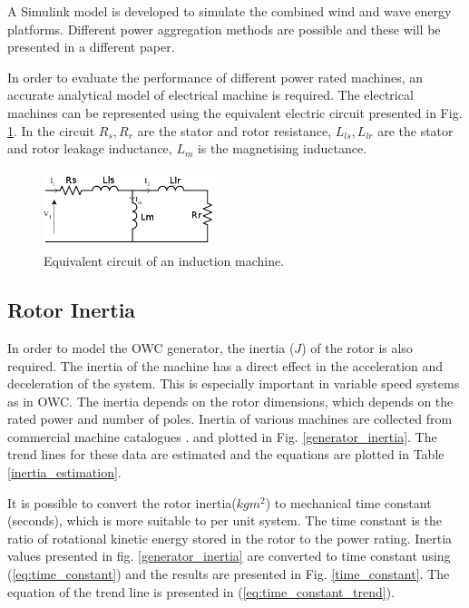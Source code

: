 \documentclass[twocolumn]{article}
\begin{document}
A Simulink model is developed to simulate the combined wind and wave energy platforms. Different power aggregation methods are possible and these will be presented in a different paper.

In order to evaluate the performance of different power rated machines, an accurate analytical model of electrical machine is required. The electrical machines can be represented using the equivalent electric circuit presented in Fig. \ref{equivalent_circuit}. In the circuit $R_s, R_r$ are the stator and rotor resistance, $L_{ls}, L_{lr}$ are the stator and rotor leakage inductance, $L_m$ is the magnetising inductance.


  \begin{figure}
    \centering
    \includegraphics[width=0.45\textwidth]{equivalent_circuit}
    \caption{Equivalent circuit of an induction machine.} 
    \label{equivalent_circuit}
  \end{figure}


\subsection{Rotor Inertia}
In order to model the OWC generator, the inertia ($J$) of the rotor is also required. The inertia of the machine has a direct effect in the acceleration and deceleration of the system. This is especially important in variable speed systems as in OWC. The inertia depends on the rotor dimensions, which depends on the rated power and number of poles. Inertia of various machines are collected from commercial machine catalogues \cite{Siemens2012}. and plotted in Fig. \ref{generator_inertia}. The trend lines for these data are estimated and the equations are plotted in Table \ref{inertia_estimation}.

It is possible to convert the rotor inertia($kgm^2$) to mechanical time constant (seconds), which is more suitable to per unit system.  The time constant is the ratio of rotational kinetic energy stored in the rotor to the power rating. Inertia values presented in fig. \ref{generator_inertia} are converted to time constant using (\ref{eq:time_constant}) and the results are presented in Fig. \ref{time_constant}. The equation of the trend line is presented in (\ref{eq:time_constant_trend}).
\end{document}
